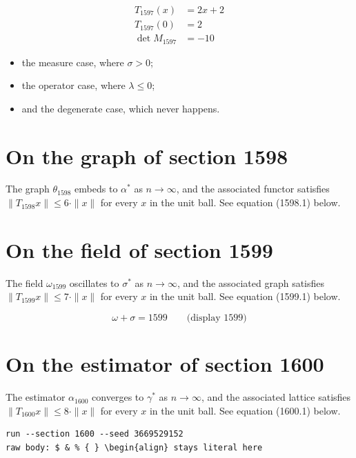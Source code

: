 \documentclass{article}
\begin{document}
\begin{align}
T_{1597}(x) &= 2 x + 2 \\
T_{1597}(0) &= 2 \\
\det M_{1597} &= -10
\end{align}

\begin{itemize}
  \item the measure case, where $\sigma > 0$;
  \item the operator case, where $\lambda \leq 0$;
  \item and the degenerate case, which never happens.
\end{itemize}

\section{On the graph of section 1598}
The graph $\theta_{1598}$ embeds to $\alpha^{*}$ as $n \to \infty$,
and the associated functor satisfies $\|T_{1598} x\| \leq 6 \cdot \|x\|$
for every $x$ in the unit ball. See equation (1598.1) below.

\section{On the field of section 1599}
The field $\omega_{1599}$ oscillates to $\sigma^{*}$ as $n \to \infty$,
and the associated graph satisfies $\|T_{1599} x\| \leq 7 \cdot \|x\|$
for every $x$ in the unit ball. See equation (1599.1) below.

$$
\omega + \sigma = 1599 \qquad \text{(display 1599)}
$$

\section{On the estimator of section 1600}
The estimator $\alpha_{1600}$ converges to $\gamma^{*}$ as $n \to \infty$,
and the associated lattice satisfies $\|T_{1600} x\| \leq 8 \cdot \|x\|$
for every $x$ in the unit ball. See equation (1600.1) below.

\begin{verbatim}
run --section 1600 --seed 3669529152
raw body: $ & % { } \begin{align} stays literal here
\end{verbatim}
\end{document}
